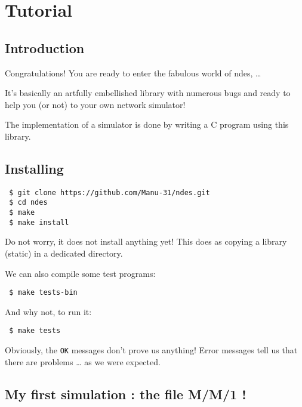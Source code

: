 %
\section{Tutorial}
\label{section:user-tuto}

\subsection{Introduction}

   Congratulations! You are ready to enter the fabulous world of
{\sc ndes}, \ldots
 
    It's basically an artfully embellished library with numerous bugs and ready to help you (or not) to your own network simulator!

    The implementation of a simulator is done by writing a
C program using this library.


\subsection{Installing}

\begin{verbatim}
 $ git clone https://github.com/Manu-31/ndes.git
 $ cd ndes
 $ make
 $ make install
\end{verbatim}

   Do not worry, it does not install anything yet! This does
as copying a library (static) in a dedicated directory.

    We can also compile some test programs:

\begin{verbatim}
 $ make tests-bin
\end{verbatim}
    And why not, to run it:

\begin{verbatim}
 $ make tests
\end{verbatim}

   Obviously, the {\tt OK} messages don't prove us anything! Error messages tell us that there are problems \ldots {} as we were expected.

\subsection{My first simulation : the file M/M/1 !}

